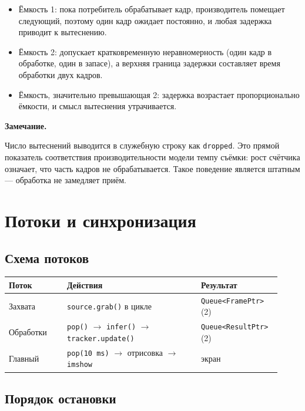 \documentclass[11pt,a4paper]{article}
\theoremstyle{definition}
\theoremstyle{remark}
\newenvironment{note}
  {\par\medskip\noindent
   \begin{lrbox}{\notebox}%
   \begin{minipage}{0.93\linewidth}%
   \small\textbf{Замечание.}\par\vspace{1pt}\noindent\ignorespaces}
  {\end{minipage}%
   \end{lrbox}%
   \fboxsep=6pt\relax
   \colorbox{codebg}{\usebox{\notebox}}%
   \par\medskip}
\begin{document}
\begin{itemize}
  \item Ёмкость 1: пока потребитель обрабатывает кадр, производитель помещает
        следующий, поэтому один кадр ожидает постоянно, и любая задержка
        приводит к вытеснению.
  \item Ёмкость 2: допускает кратковременную неравномерность (один кадр в
        обработке, один в запасе), а верхняя граница задержки составляет
        время обработки двух кадров.
  \item Ёмкость, значительно превышающая 2: задержка возрастает
        пропорционально ёмкости, и смысл вытеснения утрачивается.
\end{itemize}

\begin{note}
Число вытеснений выводится в служебную строку как \texttt{dropped}. Это
прямой показатель соответствия производительности модели темпу съёмки: рост
счётчика означает, что часть кадров не обрабатывается. Такое поведение
является штатным --- обработка не замедляет приём.
\end{note}

\section{Потоки и синхронизация}
\label{sec:threads}

\subsection{Схема потоков}

\begin{center}
\begin{tabular}{p{0.20\linewidth}p{0.46\linewidth}p{0.26\linewidth}}
\toprule
Поток & Действия & Результат \\
\midrule
Захвата & \texttt{source.grab()} в цикле & \texttt{Queue<FramePtr>}(2) \\
Обработки & \texttt{pop()} $\to$ \texttt{infer()} $\to$
\texttt{tracker.update()} & \texttt{Queue<ResultPtr>}(2) \\
Главный & \texttt{pop(10\,ms)} $\to$ отрисовка $\to$ \texttt{imshow} &
экран \\
\bottomrule
\end{tabular}
\end{center}

\subsection{Порядок остановки}
\end{document}
